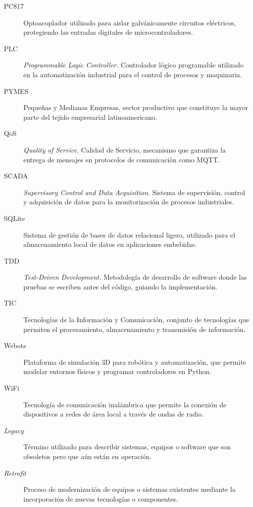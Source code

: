 \begin{description}
  \item[PC817] Optoacoplador utilizado para aislar galvánicamente circuitos eléctricos, protegiendo las entradas digitales de microcontroladores.
  
  \item[PLC] \textit{Programmable Logic Controller.} Controlador lógico programable utilizado en la automatización industrial para el control de procesos y maquinaria.
  
  \item[PYMES] Pequeñas y Medianas Empresas, sector productivo que constituye la mayor parte del tejido empresarial latinoamericano.
  
  \item[QoS] \textit{Quality of Service.} Calidad de Servicio, mecanismo que garantiza la entrega de mensajes en protocolos de comunicación como MQTT.
  
  \item[SCADA] \textit{Supervisory Control and Data Acquisition.} Sistema de supervisión, control y adquisición de datos para la monitorización de procesos industriales.
  
  \item[SQLite] Sistema de gestión de bases de datos relacional ligero, utilizado para el almacenamiento local de datos en aplicaciones embebidas.
  
  \item[TDD] \textit{Test-Driven Development.} Metodología de desarrollo de software donde las pruebas se escriben antes del código, guiando la implementación.
  
  \item[TIC] Tecnologías de la Información y Comunicación, conjunto de tecnologías que permiten el procesamiento, almacenamiento y transmisión de información.
  
  \item[Webots] Plataforma de simulación 3D para robótica y automatización, que permite modelar entornos físicos y programar controladores en Python.
  
  \item[WiFi] Tecnología de comunicación inalámbrica que permite la conexión de dispositivos a redes de área local a través de ondas de radio.
  
  \item[\textit{Legacy}] Término utilizado para describir sistemas, equipos o software que son obsoletos pero que aún están en operación.
  
  \item[\textit{Retrofit}] Proceso de modernización de equipos o sistemas existentes mediante la incorporación de nuevas tecnologías o componentes.
  

\end{description}

